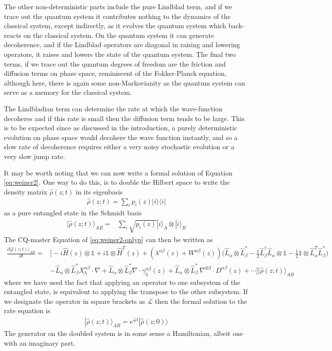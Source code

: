 \documentclass[aps,pra,showpacs,citeautoscript,amsmath,amssymb,floatfix,superscriptaddress,bbm, verbatim,amsfonts,changes,10pt,nofootinbib,longbibliography]{revtex4-1}
\newcommand{\id}{\mathbb{1}}
\newcommand{\ket}[1]{|#1\rangle}
\newcommand{\proj}[1]{|#1\rangle\!\langle#1|}
\newcommand{\foothide}[1]{\ignorespaces} %
\def\z{{z}}
\def\L{{\hat{L}}}
\def\Hq{\hat{H}}
\def\rate{{W}}
\def\linrate{{\lambda}}
\def\ab{^{\alpha\beta}}
\renewcommand{\varrho}{\hat{\rho}}
\def\cqstate{\varrho}
\def\psiz{{\varrho(\z;t)}}
\def\psizt{{\varrho(\z;t)}}
\def\friction{\gamma}
\begin{document}
The other non-deterministic parts include the pure Lindblad term, and if we trace out the quantum system it contributes nothing to the dynamics of the classical system, except indirectly, as it evolves the quantum system which back-reacts on the classical system.  On the quantum system it can generate decoherence, and if the Lindblad operators are diagonal in raising and lowering operators, it raises and lowers the state of the quantum system. The final two terms, if we trace out the quantum degrees of freedom are the friction and diffusion terms on phase space, reminiscent of the Fokker-Planck equation, although here, there is again some non-Markovianity as the quantum system can serve as a memory for the classical system.

The Lindbladian term can determine the rate at which the wave-function decoheres and if this rate is small then the diffusion term tends to be large. This is to be expected since as discussed in the introduction, a purely deterministic evolution on phase space would decohere the wave function instantly, and so a slow rate of decoherence requires either a very noisy stochastic evolution or a very slow jump rate.



It may be worth noting that we can now write a formal solution of Equation \eqref{eq:weiner2}. One way to do this, is to  double the Hilbert space\cite{FeynmanVernon1963,jamiolkowski1972linear,choi1975completely}\foothide{For the moment we take the quantum system to be finite dimensional, since extension to the continuous case is straightforward} to write the density matrix $\psiz$ in its eigenbasis
\begin{align}
\psiz=\sum_i p_i(\z)\proj{i}
\end{align}
as a pure entangled state in the Schmidt basis
\begin{align}
\ket{\psiz}_{AB}=&\sum_i \sqrt{p_i(\z)}\ket{i}_A\otimes\ket{i}_B
\end{align}
The CQ-master Equation of \eqref{eq:weiner2-onlyp} can then be written as
\begin{align}
\frac{\partial\ket{\psiz}_{AB}}{\partial t}
=&\Big[-i\Hq(\z)\otimes\id+i\id\otimes\Hq^T(\z)
+(\linrate\ab(\z)+\rate\ab(\z)) \big(\L_{\alpha}\otimes\L^*_{\beta}
-\frac{1}{2}\L^\dagger_\beta\L_\alpha\otimes\id
-\frac{1}{2}\id\otimes\L^T_\alpha\L^*_\beta\big)
\nonumber\\
&-
\L_{\alpha}\otimes\L^*_{\beta}X_h\ab\cdot\nabla
+
\L_{\alpha}\otimes\L^*_{\beta}\nabla \cdot\friction\ab_h(\z)
+
\L_{\alpha}\otimes\L^*_{\beta}\,\nabla^{\otimes 2}\cdot D^{\alpha\beta}(\z)
+\cdots
\Big]\ket{\psiz}_{AB}
\label{eq:doubled}
\end{align}
where we have used the fact that applying an operator to one subsystem of the entangled state, is equivalent to applying the transpose to the other subsystem\cite{jozsa1994fidelity}.
If we designate the operator in square brackets as $\bm{\mathcal{L}}$ then the formal solution to the rate equation is
\begin{align}
\ket{\psizt}_{AB}=e^{\bm{\mathcal{L}}t}\ket{\cqstate(\z;0)}
\label{eq:prop}
\end{align}
The generator on the doubled system is in some sense a Hamiltonian, albeit one with an imaginary part.
\end{document}
